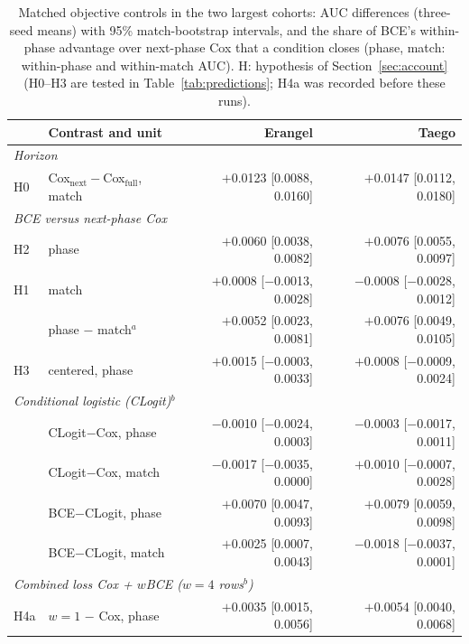 \begin{table}[t]
\centering\footnotesize
\caption{Matched objective controls in the two largest cohorts: AUC differences (three-seed means) with 95\% match-bootstrap intervals, and the share of BCE's within-phase advantage over next-phase Cox that a condition closes (phase, match: within-phase and within-match AUC). H: hypothesis of Section~\ref{sec:account} (H0--H3 are tested in Table~\ref{tab:predictions}; H4a was recorded before these runs).}
\label{tab:objective}
\setlength{\tabcolsep}{1.6pt}
\begin{tabular}{@{}llrr@{}}
\toprule
 & Contrast and unit & Erangel & Taego \\
\midrule
\multicolumn{4}{l}{\emph{Horizon}} \\
H0 & Cox$_{\mathrm{next}}-$Cox$_{\mathrm{full}}$, match & $+$0.0123 {\scriptsize[0.0088, 0.0160]} & $+$0.0147 {\scriptsize[0.0112, 0.0180]} \\
\multicolumn{4}{l}{\emph{BCE versus next-phase Cox}} \\
H2 & phase & $+$0.0060 {\scriptsize[0.0038, 0.0082]} & $+$0.0076 {\scriptsize[0.0055, 0.0097]} \\
H1 & match & $+$0.0008 {\scriptsize[$-$0.0013, 0.0028]} & $-$0.0008 {\scriptsize[$-$0.0028, 0.0012]} \\
 & phase $-$ match$^{a}$ & $+$0.0052 {\scriptsize[0.0023, 0.0081]} & $+$0.0076 {\scriptsize[0.0049, 0.0105]} \\
H3 & centered, phase & $+$0.0015 {\scriptsize[$-$0.0003, 0.0033]} & $+$0.0008 {\scriptsize[$-$0.0009, 0.0024]} \\
\multicolumn{4}{l}{\emph{Conditional logistic (CLogit)$^{b}$}} \\
 & CLogit$-$Cox, phase & $-$0.0010 {\scriptsize[$-$0.0024, 0.0003]} & $-$0.0003 {\scriptsize[$-$0.0017, 0.0011]} \\
 & CLogit$-$Cox, match & $-$0.0017 {\scriptsize[$-$0.0035, 0.0000]} & $+$0.0010 {\scriptsize[$-$0.0007, 0.0028]} \\
 & BCE$-$CLogit, phase & $+$0.0070 {\scriptsize[0.0047, 0.0093]} & $+$0.0079 {\scriptsize[0.0059, 0.0098]} \\
 & BCE$-$CLogit, match & $+$0.0025 {\scriptsize[0.0007, 0.0043]} & $-$0.0018 {\scriptsize[$-$0.0037, 0.0001]} \\
\multicolumn{4}{l}{\emph{Combined loss Cox + $w$BCE ($w{=}4$ rows$^{b}$)}} \\
H4a & $w{=}1$ $-$ Cox, phase & $+$0.0035 {\scriptsize[0.0015, 0.0056]} & $+$0.0054 {\scriptsize[0.0040, 0.0068]} \\

\end{tabular}
\end{table}
